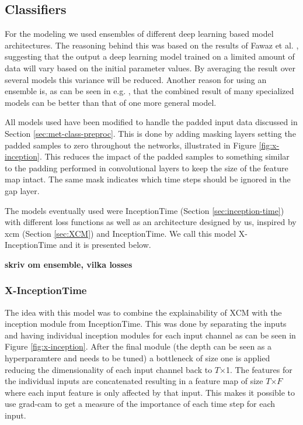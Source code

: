 \subsection{Classifiers}
For the modeling we used ensembles of different deep learning based model architectures. The reasoning behind this was based on the results of Fawaz et al. \cite{IsmailFawaz2019ensemble}, suggesting that the output a deep learning model trained on a limited amount of data will vary based on the initial parameter values. By averaging the result over several models this variance will be reduced. Another reason for using an ensemble is, as can be seen in e.g. \cite{Bagnall2015, Lines2016}, that the combined result of many specialized models can be better than that of one more general model. %

All models used have been modified to handle the padded input data discussed in Section \ref{sec:met-class-preproc}. This is done by adding masking layers setting the padded samples to zero throughout the networks, illustrated in Figure \ref{fig:x-inception}. This reduces the impact of the padded samples to something similar to the padding performed in convolutional layers to keep the size of the feature map intact. The same mask indicates which time steps should be ignored in the \gls{gap} layer.

The models eventually used were InceptionTime (Section \ref{sec:inception-time}) with different loss functions as well as an architecture designed by us, inspired by
\gls{xcm} (Section \ref{sec:XCM}) and InceptionTime. We call this model X-InceptionTime and it is presented below.

\textbf{skriv om ensemble, vilka losses}

\subsubsection{X-InceptionTime} \label{sec:xinception}
The idea with this model was to combine the explainability of XCM with the inception module from InceptionTime. This was done by separating the inputs and having individual inception modules for each input channel as can be seen in Figure \ref{fig:x-inception}. After the final module (the depth can be seen as a hyperparamtere and needs to be tuned) a bottleneck of size one is applied reducing the dimensionality of each input channel back to $T$$\times$1. The features for the individual inputs are concatenated resulting in a feature map of size $T$$\times$$F$ where each input feature is only affected by that input. This makes it possible to use \gls{grad-cam} to get a measure of the importance of each time step for each input.

